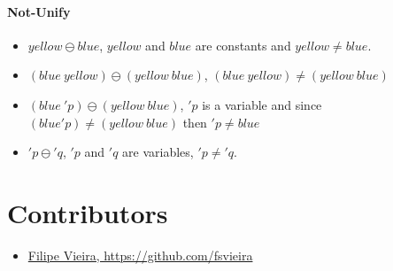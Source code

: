 \documentclass[11pt,a4paper]{report}
\newcommand{\notUnify}{\ominus}
\begin{document}
\paragraph{Not-Unify}
\begin{itemize}
\item $yellow\notUnify blue$, 
    \subitem $yellow$ and $blue$ are constants and $yellow \neq blue$.
\item $(blue\ yellow)\notUnify (yellow\ blue)$, 
    \subitem $(blue\ yellow) \neq (yellow\ blue)$
\item $(blue\ 'p)\notUnify (yellow\ blue)$, 
    \subitem $'p$ is a variable and since $(blue 'p) \neq (yellow\ blue)$ then $'p \neq blue$
\item $'p\notUnify 'q$,
    \subitem $'p$ and $'q$ are variables, $'p \neq 'q$.
\end{itemize}

\section{Contributors}
\label{sec:contributors}

\begin{itemize}
    \item \href{https://github.com/fsvieira}{Filipe Vieira, https://github.com/fsvieira}
\end{itemize}
\end{document}
